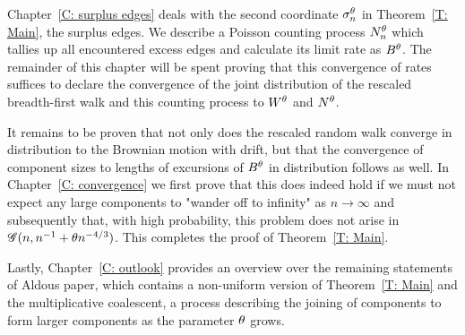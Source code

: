 Chapter~\ref{C: surplus edges} deals with the second coordinate $\mathcal{\sigma}^{\theta}_n$ in Theorem~\ref{T: Main}, the surplus edges.
We describe a Poisson counting process $N_n^{\theta}$ which tallies up all encountered excess edges and calculate its limit rate as $B^{\theta}$.
The remainder of this chapter will be spent proving that this convergence of rates suffices to declare the convergence of the joint distribution of
the rescaled breadth-first walk and this counting process to $W^{\theta}$ and $N^{\theta}$.

It remains to be proven that not only does the rescaled random walk converge in distribution to the Brownian motion with drift,
but that the convergence of component sizes to lengths of excursions of $B^{\theta}$ in distribution follows as well.
In Chapter~\ref{C: convergence} we first prove that this does indeed hold if we must not expect any large components to "wander off to infinity" as $n \rightarrow \infty$ and subsequently that, with high probability, this problem does not arise in $\mathscr{G}(n, n^{-1} + \theta n^{-4/3})$.
This completes the proof of Theorem~\ref{T: Main}.

Lastly, Chapter~\ref{C: outlook} provides an overview over the remaining statements of Aldous paper,
which contains a non-uniform version of Theorem~\ref{T: Main} and the multiplicative coalescent, 
a process describing the joining of components to form larger components as the parameter $\theta$ grows.

